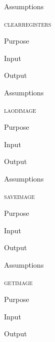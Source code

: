 \documentclass[pdftex, 11pt]{article}
\begin{document}
\begin{description}
\begin{description}
			\item{Assumptions}


		\end{description}



	\item{\textsc{clearregisters}}
		\begin{description}
			\item{Purpose}


			\item{Input}


			\item{Output}


			\item{Assumptions}


		\end{description}



	\item{\textsc{laodimage}}
		\begin{description}
			\item{Purpose}


			\item{Input}


			\item{Output}


			\item{Assumptions}


		\end{description}



	\item{\textsc{saveimage}}
		\begin{description}
			\item{Purpose}


			\item{Input}


			\item{Output}


			\item{Assumptions}


		\end{description}



	\item{\textsc{getimage}}
		\begin{description}
			\item{Purpose}


			\item{Input}


			\item{Output}



\end{description}
\end{description}
\end{document}
